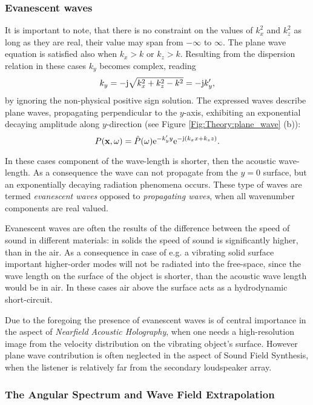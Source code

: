 \subsubsection{Evanescent waves}
It is important to note, that there is no constraint on the values of $k_x^2$ and $k_z^2$ as long as they are real, their value may span from $-\infty$ to $\infty$. The plane wave equation is satisfied also when $k_x>k$ or $k_z>k$. Resulting from the dispersion relation in these cases $k_y$ becomes complex, reading
\begin{equation}
k_y = -\mathrm{j} \sqrt{ k_x^2 + k_z^2 - k^2 }=-\mathrm{j} k_y',
\end{equation}
by ignoring the non-physical positive sign solution.
The expressed waves describe plane waves, propagating perpendicular to the $y$-axis, exhibiting an exponential decaying amplitude along $y$-direction (see Figure \ref{Fig:Theory:plane_wave} (b)):
\begin{equation}
P(\mathbf{x},\omega) = \hat{P}(\omega) \mathrm{e}^{-k_y' y} \mathrm{e}^{-\mathrm{j} \left( k_x x + k_z z \right) }.
\end{equation}

In these cases component of the wave-length is shorter, then the acoustic wave-length. As a consequence the wave can not propagate from the $y = 0$ surface, but an exponentially decaying radiation phenomena occurs. These type of waves are termed \emph{evanescent waves} opposed to \emph{propagating waves}, when all wavenumber components are real valued.

Evanescent waves are often the results of the difference between the speed of sound in different materials: in solids the speed of sound is significantly higher, than in the air. As a consequence in case of e.g. a vibrating solid surface important higher-order modes will not be radiated into the free-space, since the wave length on the surface of the object is shorter, than the acoustic wave length would be in air. In these cases air above the surface acts as a hydrodynamic short-circuit.

Due to the foregoing the presence of evanescent waves is of central importance in the aspect of \emph{Nearfield Acoustic Holography}, when one needs a high-resolution image from the velocity distribution on the vibrating object's surface.
However plane wave contribution is often neglected in the aspect of Sound Field Synthesis, when the listener is relatively far from the secondary loudspeaker array.


\subsubsection{The Angular Spectrum and Wave Field Extrapolation}

